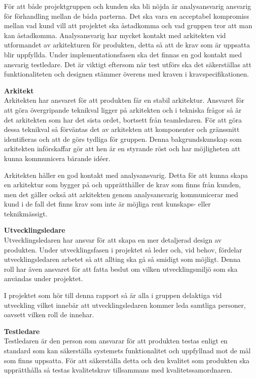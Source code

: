 För att både projektgruppen och kunden ska bli nöjda är analysansvarig ansvarig för förhandling mellan de båda parterna. Det ska vara en acceptabel kompromiss mellan vad kund vill att projektet ska åstadkomma och vad gruppen tror att man kan åstadkomma. Analysansvarig har mycket kontakt med arkitekten vid utformandet av arkitekturen för produkten, detta så att de krav som är uppsatta blir uppfyllda. Under implementationsfasen ska det finnas en god kontakt med ansvarig testledare. Det är viktigt eftersom när test utförs ska det säkerställas att funktionaliteten och designen stämmer överens med kraven i kravspecifikationen.

\textbf{Arkitekt}\\
Arkitekten har ansvaret för att produkten får en stabil arkitektur. Ansvaret för att göra övergripande teknikval ligger på arkitekten och i tekniska frågor så är det arkitekten som har det sista ordet, bortsett från teamledaren. För att göra dessa teknikval så förväntas det av arkitekten att komponenter och gränssnitt identifieras och att de görs tydliga för gruppen. Denna bakgrundskunskap som arkitekten införskaffar gör att hen är en styrande röst och har möjligheten att kunna kommunicera bärande idéer.

Arkitekten håller en god kontakt med analysansvarig. Detta för att kunna skapa en arkitektur som bygger på och upprätthåller de krav som finns från kunden, men det gäller också att arkitekten genom analysansvarig kommunicerar med kund i de fall det finns krav som inte är möjliga rent kunskaps- eller teknikmässigt.

\textbf{Utvecklingsledare}\\
 Utvecklingsledaren har ansvar för att skapa en mer detaljerad design av produkten. Under utvecklingsfasen i projektet så leder och, vid behov, fördelar utvecklingsledaren arbetet så att allting ska gå så smidigt som möjligt. Denna roll har även ansvaret för att fatta beslut om vilken utvecklingsmiljö som ska användas under projektet.

I projektet som hör till denna rapport så är alla i gruppen delaktiga vid utveckling vilket innebär att utvecklingsledaren kommer leda samtliga personer, oavsett vilken roll de innehar.

\textbf{Testledare}\\
Testledaren är den person som ansvarar för att produkten testas enligt en standard som kan säkerställa systemets funktionalitet och uppfyllnad mot de mål som finns uppsatta. För att säkerställa detta och den kvalitet som produkten ska upprätthålla så testas kvalitetskrav tillsammans med kvalitetssamordnaren.

